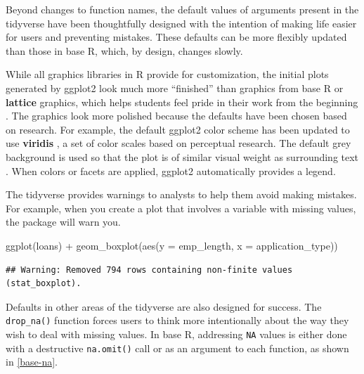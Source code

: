 \documentclass[12pt]{article}
\newenvironment{Shaded}{\begin{snugshade}}{\end{snugshade}}
\newcommand{\AttributeTok}[1]{\textcolor[rgb]{0.77,0.63,0.00}{#1}}
\newcommand{\FunctionTok}[1]{\textcolor[rgb]{0.00,0.00,0.00}{#1}}
\newcommand{\NormalTok}[1]{#1}
\newcommand{\SpecialCharTok}[1]{\textcolor[rgb]{0.00,0.00,0.00}{#1}}
\begin{document}
Beyond changes to function names, the default values of arguments
present in the tidyverse have been thoughtfully designed with the
intention of making life easier for users and preventing mistakes. These
defaults can be more flexibly updated than those in base R, which, by
design, changes slowly.

While all graphics libraries in R provide for customization, the initial
plots generated by ggplot2 look much more ``finished'' than graphics
from base R or \textbf{lattice} \citep{R-lattice} graphics, which helps
students feel pride in their work from the beginning
\citep{myint2020comparison}. The graphics look more polished because the
defaults have been chosen based on research. For example, the default
ggplot2 color scheme has been updated to use \textbf{viridis}
\citep{R-viridis}, a set of color scales based on perceptual research.
The default grey background is used so that the plot is of similar
visual weight as surrounding text \citep{Wic2021}. When colors or facets
are applied, ggplot2 automatically provides a legend.

The tidyverse provides warnings to analysts to help them avoid making
mistakes. For example, when you create a plot that involves a variable
with missing values, the package will warn you.

\linespread{1}

\begin{Shaded}
\begin{Highlighting}[]
\FunctionTok{ggplot}\NormalTok{(loans) }\SpecialCharTok{+} 
  \FunctionTok{geom\_boxplot}\NormalTok{(}\FunctionTok{aes}\NormalTok{(}\AttributeTok{y =}\NormalTok{ emp\_length, }\AttributeTok{x =}\NormalTok{ application\_type))}
\end{Highlighting}
\end{Shaded}

\begin{verbatim}
## Warning: Removed 794 rows containing non-finite values (stat_boxplot).
\end{verbatim}


\label{ggplot-warn} \linespread{2}
\vspace{3mm}\setlength{\parindent}{15pt}

Defaults in other areas of the tidyverse are also designed for success.
The \texttt{drop\_na()} function forces users to think more
intentionally about the way they wish to deal with missing values. In
base R, addressing \texttt{NA} values is either done with a destructive
\texttt{na.omit()} call or as an argument to each function, as shown in
\ref{base-na}.
\end{document}
